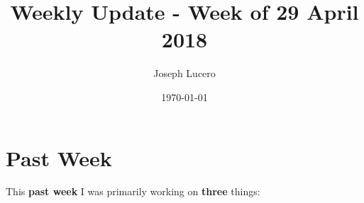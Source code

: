 \documentclass[12pt]{article}
\title{Weekly Update - Week of 29 April 2018}
\author{Joseph Lucero}
\date{\today}
\begin{document}
\maketitle

%

\section{Past Week}

This \textbf{past week} I was primarily working on \textbf{three} things:
\end{document}
